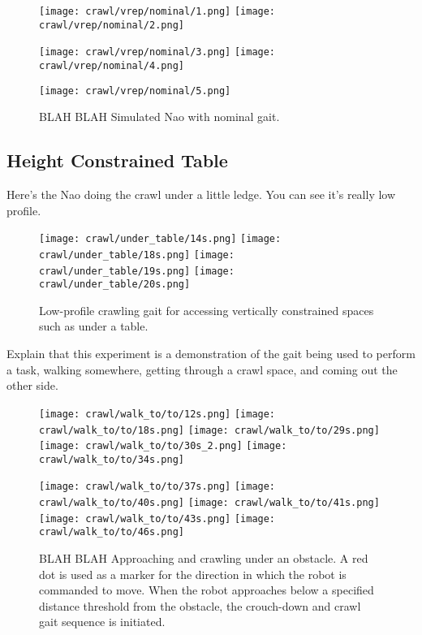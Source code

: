 \begin{figure}
  \centerline{
    \texttt{[image: crawl/vrep/nominal/1.png]}
    \texttt{[image: crawl/vrep/nominal/2.png]}
  }
  \centerline{
    \texttt{[image: crawl/vrep/nominal/3.png]}
    \texttt{[image: crawl/vrep/nominal/4.png]}
  }
  \centerline{
    \texttt{[image: crawl/vrep/nominal/5.png]}
  }
  \caption{BLAH BLAH Simulated Nao with nominal gait.}
  \label{fig:vrep_nao_nom_gait1}
\end{figure}

\subsection{Height Constrained Table}

Here's the Nao doing the crawl under a little ledge.
You can see it's really low profile.

\begin{figure}
  \centerline{
    \texttt{[image: crawl/under\_table/14s.png]}
    \texttt{[image: crawl/under\_table/18s.png]}
    \texttt{[image: crawl/under\_table/19s.png]}
    \texttt{[image: crawl/under\_table/20s.png]}
  }
  \caption{Low-profile crawling gait for accessing vertically constrained spaces such as under a table.}
  \label{fig:nao_crawl1}
\end{figure}

Explain that this experiment is a demonstration of the gait being used to perform a task,
walking somewhere, getting through a crawl space, and coming out the other side.

\begin{figure}
  \centerline{
    \texttt{[image: crawl/walk\_to/to/12s.png]}
    \texttt{[image: crawl/walk\_to/to/18s.png]}
    \texttt{[image: crawl/walk\_to/to/29s.png]}
    \texttt{[image: crawl/walk\_to/to/30s\_2.png]}
    \texttt{[image: crawl/walk\_to/to/34s.png]}
  }
  \centerline{
    \texttt{[image: crawl/walk\_to/to/37s.png]}
    \texttt{[image: crawl/walk\_to/to/40s.png]}
    \texttt{[image: crawl/walk\_to/to/41s.png]}
    \texttt{[image: crawl/walk\_to/to/43s.png]}
    \texttt{[image: crawl/walk\_to/to/46s.png]}
  }
  \caption{BLAH BLAH Approaching and crawling under an obstacle.
           A red dot is used as a marker for the direction in which the robot is commanded to move.
           When the robot approaches below a specified distance threshold from the obstacle,
           the crouch-down and crawl gait sequence is initiated.}
  \label{fig:nao_crawl3}
\end{figure}

